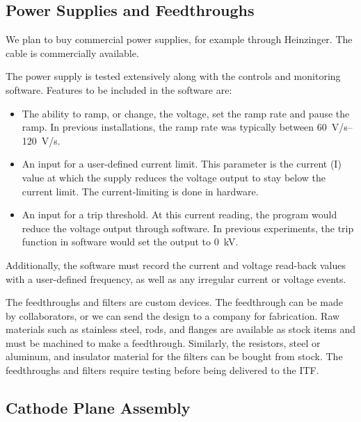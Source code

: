 \subsection{Power Supplies and Feedthroughs}
\label{sec:fdsp-hv-supplies-feedthroughs}

We plan to buy commercial power supplies, %
for example through Heinzinger. The  cable is commercially available.

The power supply is tested extensively along with the controls and monitoring software.  Features to be included in the software are:
\begin{itemize}
\item The ability to ramp, or change, the voltage, set the ramp rate and pause the ramp. %
In previous installations, the ramp rate was typically between \SIrange{60}{120}{V/s}.
\item An input for a user-defined current limit.  This parameter is the current (I) value at which the supply reduces the voltage output to stay below the current limit.  The current-limiting is done in hardware.
\item An input for a trip threshold.  At this current reading, the program would reduce the voltage output through software.  In previous experiments, the trip function in software would set the output to \SI{0}{kV}.
\end{itemize}
Additionally, the software must
record the current and voltage read-back values with a user-defined frequency, as well as any irregular current or voltage events.

The  feedthroughs and filters are custom devices.  %
The feedthrough can be made by collaborators, or we can send the design to a company for fabrication.  Raw materials such as stainless steel,  rods, and flanges are available as stock items and must be machined to make a feedthrough.  Similarly, the resistors, steel or aluminum, and insulator material for the filters can be bought from stock.  The feedthroughs and filters require testing before being delivered to the ITF. 

\subsection{Cathode Plane Assembly}
\label{sec:fdsp-hv-prod-cpa}

